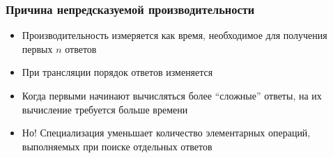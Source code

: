 \documentclass{beamer}
\begin{document}
\begin{frame}[fragile]
\begin{columns}
\begin{column}[]{0.6\textwidth}
\begin{center}
      \end{center}
    \end{column}
  \end{columns}
\end{frame}

\begin{frame}[fragile]
  \frametitle{Причина непредсказуемой производительности}
  \begin{itemize}
    \item Производительность измеряется как время, необходимое для получения первых $n$ ответов
    \item При трансляции порядок ответов изменяется
    \item Когда первыми начинают вычисляться более ``сложные'' ответы, на их вычисление требуется больше времени
  \end{itemize}

  \begin{itemize}
    \item Но! Специализация уменьшает количество элементарных операций, выполняемых при поиске отдельных ответов
  \end{itemize}
\end{frame}
\end{document}
